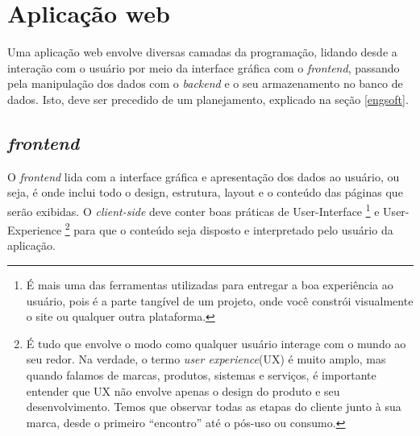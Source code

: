 
\section{Aplicação web}
Uma aplicação web envolve diversas camadas da programação, lidando desde a interação com o usuário por meio da interface gráfica com o \textit{frontend}, passando pela manipulação dos dados com o \textit{backend} e o seu armazenamento no banco de dados. Isto, deve ser precedido de um planejamento, explicado na seção \ref{engsoft}.

\subsection{\textit{frontend}}
O \textit{frontend} lida com a interface gráfica e apresentação dos dados ao usuário, ou seja, é onde inclui todo o design, estrutura, layout e o conteúdo das páginas que serão exibidas. O \textit{client-side} deve conter boas práticas de User-Interface
\footnote{É mais uma das ferramentas utilizadas para entregar a boa experiência ao usuário, pois é a parte tangível de um projeto, onde você constrói visualmente o site ou qualquer outra plataforma.}
e User-Experience
\footnote{É tudo que envolve o modo como qualquer usuário interage com o mundo ao seu redor. Na verdade, o termo \textit{user experience}(UX) é muito amplo, mas quando falamos de marcas, produtos, sistemas e serviços, é importante entender que UX não envolve apenas o design do produto e seu desenvolvimento. Temos que observar todas as etapas do cliente junto à sua marca, desde o primeiro “encontro” até o pós-uso ou consumo.} 
para que o conteúdo seja disposto e interpretado pelo usuário da aplicação. \cite{SOUTO}

